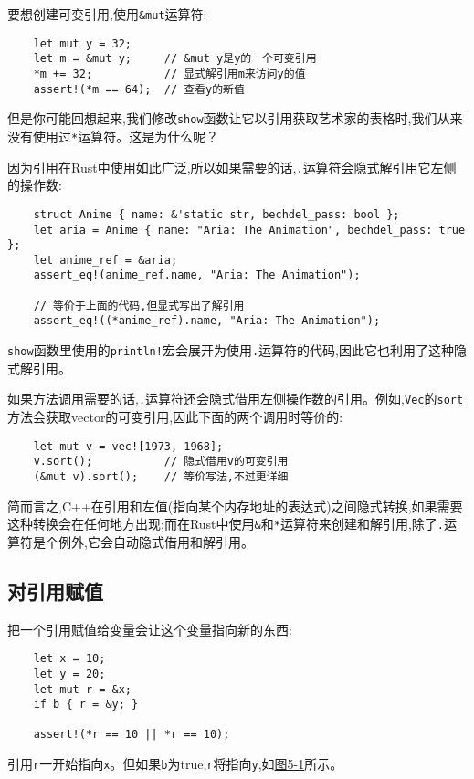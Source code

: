 要想创建可变引用,使用\texttt{\&mut}运算符:
\begin{verbatim}
    let mut y = 32;
    let m = &mut y;     // &mut y是y的一个可变引用
    *m += 32;           // 显式解引用m来访问y的值
    assert!(*m == 64);  // 查看y的新值
\end{verbatim}

但是你可能回想起来,我们修改\texttt{show}函数让它以引用获取艺术家的表格时,我们从来没有使用过\texttt{*}运算符。这是为什么呢？

因为引用在Rust中使用如此广泛,所以如果需要的话,\texttt{.}运算符会隐式解引用它左侧的操作数:
\begin{verbatim}
    struct Anime { name: &'static str, bechdel_pass: bool };
    let aria = Anime { name: "Aria: The Animation", bechdel_pass: true };
    let anime_ref = &aria;
    assert_eq!(anime_ref.name, "Aria: The Animation");

    // 等价于上面的代码,但显式写出了解引用
    assert_eq!((*anime_ref).name, "Aria: The Animation");
\end{verbatim}

\texttt{show}函数里使用的\texttt{println!}宏会展开为使用\texttt{.}运算符的代码,因此它也利用了这种隐式解引用。

如果方法调用需要的话,\texttt{.}运算符还会隐式借用左侧操作数的引用。例如,\texttt{Vec}的\texttt{sort}方法会获取vector的可变引用,因此下面的两个调用时等价的:
\begin{verbatim}
    let mut v = vec![1973, 1968];
    v.sort();           // 隐式借用v的可变引用
    (&mut v).sort();    // 等价写法,不过更详细
\end{verbatim}

简而言之,C++在引用和左值(指向某个内存地址的表达式)之间隐式转换,如果需要这种转换会在任何地方出现;而在Rust中使用\texttt{\&}和\texttt{*}运算符来创建和解引用,除了\texttt{.}运算符是个例外,它会自动隐式借用和解引用。

\subsection{对引用赋值}
把一个引用赋值给变量会让这个变量指向新的东西:
\begin{verbatim}
    let x = 10;
    let y = 20;
    let mut r = &x;
    if b { r = &y; }

    assert!(*r == 10 || *r == 10);
\end{verbatim}

引用\texttt{r}一开始指向\texttt{x}。但如果\texttt{b}为true,\texttt{r}将指向\texttt{y},如\hyperref[f5-1]{图5-1}所示。

